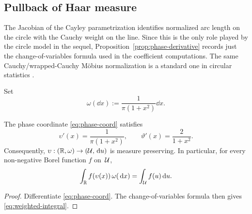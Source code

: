 \subsection{Pullback of Haar measure}%
\label{sec:haar-pullback}

The Jacobian of the Cayley parametrization identifies normalized arc
length on the circle with the Cauchy weight on the line.  Since this is
the only role played by the circle model in the sequel, Proposition~\ref{prop:phase-derivative}
records just the change-of-variables formula used in the coefficient
computations.  The same Cauchy/wrapped-Cauchy M{\"o}bius normalization is a
standard one in circular statistics
\cite{KentTyler1988WrappedCauchy,McCullagh1992CauchyModels,
McCullagh1996CauchyMobius,
KatoJones2010MobiusCircle,KatoMcCullagh2020SphereCauchyMobius}.

Set
\begin{equation}\label{eq:cauchy-measure}
\omega(\dd x):=\frac{1}{\pi(1+x^{2})}\dd x.
\end{equation}

\begin{proposition}\label{prop:phase-derivative}
The phase coordinate \eqref{eq:phase-coord} satisfies
\begin{equation}\label{eq:phase-deriv}
\upsilon'(x)=\frac{1}{\pi(1+x^{2})},
\qquad
\vartheta'(x)=\frac{2}{1+x^{2}}.
\end{equation}
Consequently, $\upsilon:(\mathbb{R},\omega)\to(\mathcal{U},\,\mathrm{d} u)$ is measure preserving.
In particular, for every non-negative Borel function $f$ on~$\mathcal{U}$,
\begin{equation}\label{eq:weighted-integral}
\int_{\mathbb{R}}f(\upsilon(x))\,\omega(\,\mathrm{d} x)=\int_{\mathcal{U}}f(u)\,\mathrm{d} u.
\end{equation}
\end{proposition}

\begin{proof}
Differentiate \eqref{eq:phase-coord}.  The change-of-variables formula
then gives \eqref{eq:weighted-integral}.
\end{proof}

